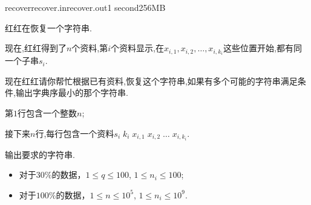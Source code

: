 \documentclass[11pt,a4paper,oneside]{article}
\begin{document}
\begin{problem}{recover}{recover.in}{recover.out}{1 second}{256MB}

    红红在恢复一个字符串.
    
    现在,红红得到了$n$个资料,第$i$个资料显示,在$x_{i,1}, x_{i, 2}, \dots, x_{i, k_i}$这些位置开始,都有同一个子串$s_i$.
    
    现在红红请你帮忙根据已有资料,恢复这个字符串,如果有多个可能的字符串满足条件,输出字典序最小的那个字符串.
    
    \InputFile

	第$1$行包含一个整数$n$;
	
	接下来$n$行,每行包含一个资料$s_i \; k_i \; x_{i,1} \; x_{i,2} \; \dots \; x_{i, k_i}$.

    \OutputFile

	输出要求的字符串.

    \Example

    \begin{example}
    \end{example}

    \begin{example}
	\end{example}

    \begin{example}
	\end{example}

    \Note
    
    \begin{itemize}
		\item 对于$30\%$的数据，$1 \leq q \leq 100$, $1 \leq n_i \leq 100$;
		\item 对于$100\%$的数据，$1 \leq n \leq 10^5$, $1 \leq n_i \leq 10^9$.
    \end{itemize}

\end{problem}
\end{document}
